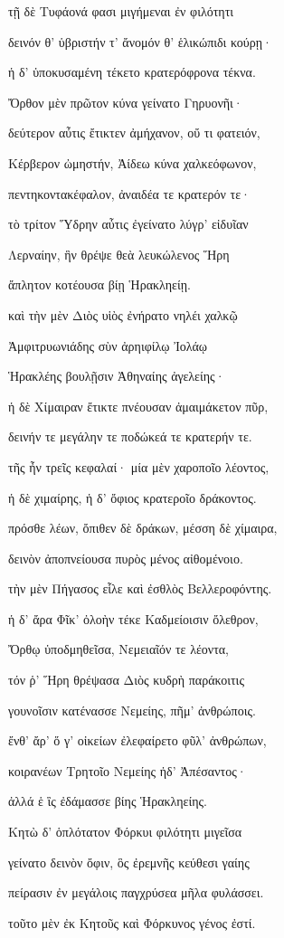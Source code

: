 \begin{pages}
\begin{Leftside}
τῇ δὲ Τυφάονά φασι μιγήμεναι ἐν φιλότητι

δεινόν θ' ὑβριστήν τ' ἄνομόν θ' ἑλικώπιδι κούρῃ· 

ἡ δ' ὑποκυσαμένη τέκετο κρατερόφρονα τέκνα.

Ὄρθον μὲν πρῶτον κύνα γείνατο Γηρυονῆι· 

δεύτερον αὖτις ἔτικτεν ἀμήχανον, οὔ τι φατειόν,  

Κέρβερον ὠμηστήν, Ἀίδεω κύνα χαλκεόφωνον,

πεντηκοντακέφαλον, ἀναιδέα τε κρατερόν τε· 

τὸ τρίτον Ὕδρην αὖτις ἐγείνατο λύγρ' εἰδυῖαν 

Λερναίην, ἣν θρέψε θεὰ λευκώλενος Ἥρη

ἄπλητον κοτέουσα βίῃ Ἡρακληείῃ. 

καὶ τὴν μὲν Διὸς υἱὸς ἐνήρατο νηλέι χαλκῷ

Ἀμφιτρυωνιάδης σὺν ἀρηιφίλῳ Ἰολάῳ

Ἡρακλέης βουλῇσιν Ἀθηναίης ἀγελείης·

ἡ δὲ Χίμαιραν ἔτικτε πνέουσαν ἀμαιμάκετον πῦρ,

δεινήν τε μεγάλην τε ποδώκεά τε κρατερήν τε.  

τῆς ἦν τρεῖς κεφαλαί· μία μὲν χαροποῖο λέοντος,

ἡ δὲ χιμαίρης, ἡ δ' ὄφιος κρατεροῖο δράκοντος.

πρόσθε λέων, ὄπιθεν δὲ δράκων, μέσση δὲ χίμαιρα,

δεινὸν ἀποπνείουσα πυρὸς μένος αἰθομένοιο.

τὴν μὲν Πήγασος εἷλε καὶ ἐσθλὸς Βελλεροφόντης. 

ἡ δ' ἄρα Φῖκ' ὀλοὴν τέκε Καδμείοισιν ὄλεθρον,

Ὄρθῳ ὑποδμηθεῖσα, Νεμειαῖόν τε λέοντα, 

τόν ῥ' Ἥρη θρέψασα Διὸς κυδρὴ παράκοιτις

γουνοῖσιν κατένασσε Νεμείης, πῆμ' ἀνθρώποις.

ἔνθ' ἄρ' ὅ γ' οἰκείων ἐλεφαίρετο φῦλ' ἀνθρώπων, 

κοιρανέων Τρητοῖο Νεμείης ἠδ' Ἀπέσαντος· 

ἀλλά ἑ ἲς ἐδάμασσε βίης Ἡρακληείης.

Κητὼ δ' ὁπλότατον Φόρκυι φιλότητι μιγεῖσα

γείνατο δεινὸν ὄφιν, ὃς ἐρεμνῆς κεύθεσι γαίης

πείρασιν ἐν μεγάλοις παγχρύσεα μῆλα φυλάσσει. 

τοῦτο μὲν ἐκ Κητοῦς καὶ Φόρκυνος γένος ἐστί. 


\end{Leftside}
\end{pages}

